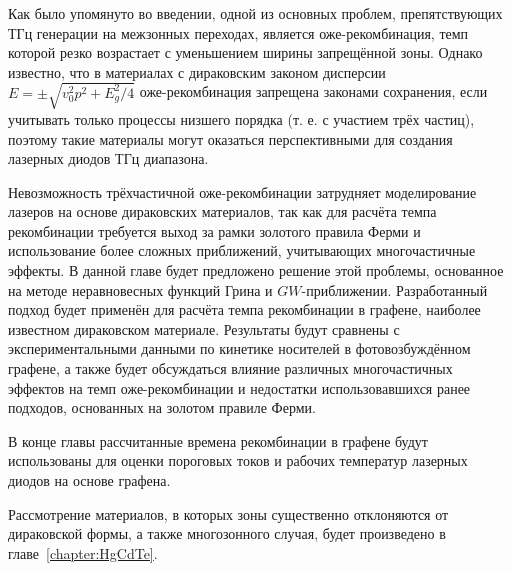 Как было упомянуто во введении, одной из основных проблем, препятствующих ТГц генерации на межзонных переходах, является оже-рекомбинация, темп которой резко возрастает с уменьшением ширины запрещённой зоны. Однако известно, что в материалах с дираковским законом дисперсии $E = \pm\sqrt{v_0^2 p^2 + E_g^2/4}$ оже-рекомбинация запрещена законами сохранения, если учитывать только процессы низшего порядка (т. е. с участием трёх частиц), поэтому такие материалы могут оказаться перспективными для создания лазерных диодов ТГц диапазона.

Невозможность трёхчастичной оже-рекомбинации затрудняет моделирование лазеров на основе дираковских материалов, так как для расчёта темпа рекомбинации требуется выход за рамки золотого правила Ферми и использование более сложных приближений, учитывающих многочастичные эффекты. В данной главе будет предложено решение этой проблемы, основанное на методе неравновесных функций Грина и $GW$-приближении. Разработанный подход будет применён для расчёта темпа рекомбинации в графене, наиболее известном дираковском материале. Результаты будут сравнены с экспериментальными данными по кинетике носителей в фотовозбуждённом графене, а также будет обсуждаться влияние различных многочастичных эффектов на темп оже-рекомбинации и недостатки использовавшихся ранее подходов, основанных на золотом правиле Ферми.

В конце главы рассчитанные времена рекомбинации в графене будут использованы для оценки пороговых токов и рабочих температур лазерных диодов на основе графена.

Рассмотрение материалов, в которых зоны существенно отклоняются от дираковской формы, а также многозонного случая, будет произведено в главе~\ref{chapter:HgCdTe}. 